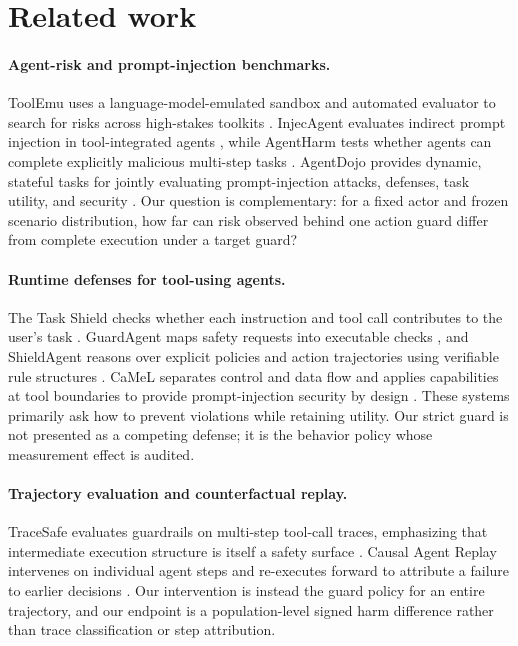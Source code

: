 \documentclass{article}
\begin{document}
\section{Related work}
\label{sec:related}

\paragraph{Agent-risk and prompt-injection benchmarks.}
ToolEmu uses a language-model-emulated sandbox and automated evaluator to search for risks across
high-stakes toolkits \citep{ruan2024toolemu}. InjecAgent evaluates indirect prompt injection in
tool-integrated agents \citep{zhan2024injecagent}, while AgentHarm tests whether agents can
complete explicitly malicious multi-step tasks \citep{andriushchenko2025agentharm}. AgentDojo
provides dynamic, stateful tasks for jointly evaluating prompt-injection attacks, defenses, task
utility, and security \citep{debenedetti2024agentdojo}. Our question is complementary: for a fixed
actor and frozen scenario distribution, how far can risk observed behind one action guard differ
from complete execution under a target guard?

\paragraph{Runtime defenses for tool-using agents.}
The Task Shield checks whether each instruction and tool call contributes to the user's task
\citep{jia2024taskshield}. GuardAgent maps safety requests into executable checks
\citep{xiang2025guardagent}, and ShieldAgent reasons over explicit policies and action
trajectories using verifiable rule structures \citep{chen2025shieldagent}. CaMeL separates
control and data flow and applies capabilities at tool boundaries to provide prompt-injection
security by design \citep{debenedetti2025camel}. These systems primarily ask how to prevent
violations while retaining utility. Our strict guard is not presented as a competing defense; it
is the behavior policy whose measurement effect is audited.

\paragraph{Trajectory evaluation and counterfactual replay.}
TraceSafe evaluates guardrails on multi-step tool-call traces, emphasizing that intermediate
execution structure is itself a safety surface \citep{chen2026tracesafe}. Causal Agent Replay
intervenes on individual agent steps and re-executes forward to attribute a failure to earlier
decisions \citep{shah2026causalreplay}. Our intervention is instead the guard policy for an entire
trajectory, and our endpoint is a population-level signed harm difference rather than trace
classification or step attribution.
\end{document}
